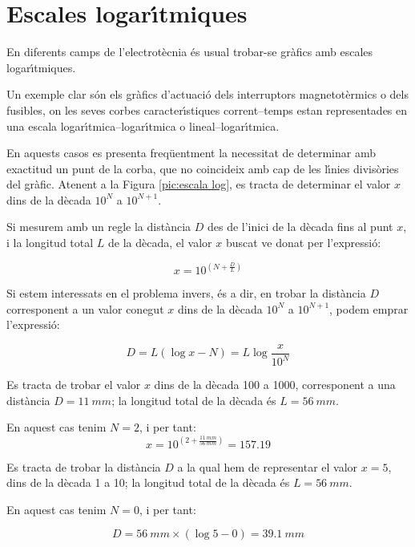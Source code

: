 \section{Escales logar\'{\i}tmiques} 

En diferents camps de l'electrot\`{e}cnia \'{e}s usual trobar-se gr\`{a}fics amb escales
logar\'{\i}tmiques.

Un exemple clar s\'{o}n els gr\`{a}fics d'actuaci\'{o} dels interruptors magnetot\`{e}rmics o dels
fusibles, on les seves corbes caracter\'{\i}stiques corrent--temps estan representades en
una escala logar\'{\i}tmica--logar\'{\i}tmica o lineal--logar\'{\i}tmica.

En aquests casos es presenta freq\"{u}entment la necessitat de determinar amb exactitud un
punt de la corba, que no coincideix amb cap de les l\'{\i}nies divis\`{o}ries del gr\`{a}fic. Atenent a
la Figura \vref{pic:escala log}, es tracta de determinar el valor $x$ dins de la d\`{e}cada
$10^N$ a $10^{N+1}$.

\begin{center}
    
    \label{pic:escala log}
\end{center}

Si mesurem amb un regle la dist\`{a}ncia $D$ des de l'inici de la d\`{e}cada fins al punt $x$, i
la longitud total $L$ de la d\`{e}cada, el valor $x$ buscat ve donat per l'expressi\'{o}:

\begin{equation}
    x = 10^{\left(N+\frac{D}{L}\right)}
\end{equation}

Si estem interessats en el problema invers, \'{e}s a dir, en  trobar la dist\`{a}ncia $D$
corresponent a un valor conegut $x$ dins de la d\`{e}cada $10^N$ a $10^{N+1}$, podem emprar
l'expressi\'{o}:

\begin{equation}
    D = L(\log x - N) = L \log\frac{x}{10^N}
\end{equation}

\begin{exemple}
    Es tracta de trobar el valor $x$ dins de la d\`{e}cada 100 a 1000, corresponent a una
    dist\`{a}ncia $D=\SI{11}{mm}$; la longitud total de la d\`{e}cada \'{e}s $L=\SI{56}{mm}$.

    En aquest cas tenim $N=2$, i per tant:
    \[
        x = 10^{\left(2+\frac{\SI{11}{mm}}{\SI{56}{mm}}\right)}= \num{157,19}
    \]
\end{exemple}

\begin{exemple}
    Es tracta de trobar la dist\`{a}ncia $D$ a la qual hem de representar el valor $x=5$, dins de la
    d\`{e}cada 1 a 10; la longitud total de la d\`{e}cada \'{e}s $L=\SI{56}{mm}$.

    En aquest cas tenim $N=0$, i per tant:

    \[
        D = \SI{56}{mm} \times (\log 5 - 0)  = \SI{39,1}{mm}
    \]
\end{exemple}

